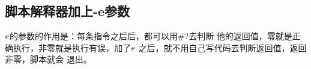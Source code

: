 \subsection{脚本解释器加上-e参数}
$\-e$的参数的作用是：每条指令之后后，都可以用$\#$?去判断
他的返回值，零就是正确执行，非零就是执行有误，加了$\-e$
之后，就不用自己写代码去判断返回值，返回非零，脚本就会
退出。